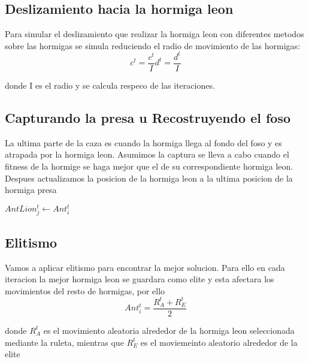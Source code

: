   \subsection{Deslizamiento hacia la hormiga leon}
   Para simular el deslizamiento que realizar la hormiga leon con diferentes metodos sobre las hormigas se simula reduciendo el radio
   de movimiento de las hormigas:\\

   \begin{equation}
    c^t = \frac{c^t}{I}
    d^t = \frac{d^t}{I}
  \end{equation}

  donde I es el radio y se calcula respeco de las iteraciones.

  \subsection{Capturando la presa u Recostruyendo el foso}
  La ultima parte de la caza es cuando la hormiga llega al fondo del foso y es atrapada por la hormiga leon.
  Asumimos la captura se lleva a cabo cuando el fitness de la hormige se haga mejor que el de su correspondiente hormiga leon.\\
  Despues actualizamos la posicion de la hormiga leon a la ultima posicion de la hormiga presa

  \begin{algorithm}[H]
    \begin{algorithmic}[1]
        \State $AntLion_j^t \gets Ant_i^t$
      \EndIf
    \end{algorithmic}
  \end{algorithm}

  \subsection{Elitismo}
  Vamos a aplicar elitismo para encontrar la mejor solucion. Para ello en cada iteracion la mejor hormiga leon se 
  guardara como elite y esta afectara los movimientos del resto de hormigas, por ello
  \begin{equation}
   Ant_i^t = \frac{R_A^t + R_E^t}{2}
  \end{equation}

  donde $R_A^t$ es el movimiento aleatoria alrededor de la hormiga leon seleccionada mediante la ruleta, mientras que
   $R_E^t$ es el moviemeinto aleatorio alrededor de la elite


